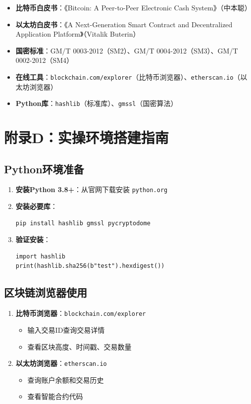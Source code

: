 ﻿\documentclass[12pt,a4paper]{article}
\begin{document}
\begin{itemize}[leftmargin=1.5em]
\item \textbf{比特币白皮书}：《Bitcoin: A Peer-to-Peer Electronic Cash System》（中本聪）
\item \textbf{以太坊白皮书}：《A Next-Generation Smart Contract and Decentralized Application Platform》（Vitalik Buterin）
\item \textbf{国密标准}：GM/T 0003-2012（SM2）、GM/T 0004-2012（SM3）、GM/T 0002-2012（SM4）
\item \textbf{在线工具}：\texttt{blockchain.com/explorer}（比特币浏览器）、\texttt{etherscan.io}（以太坊浏览器）
\item \textbf{Python库}：\texttt{hashlib}（标准库）、\texttt{gmssl}（国密算法）
\end{itemize}

\section{附录D：实操环境搭建指南}

\subsection{Python环境准备}

\begin{enumerate}[leftmargin=1.5em]
\item \textbf{安装Python 3.8+}：从官网下载安装 \texttt{python.org}
\item \textbf{安装必要库}：
\begin{lstlisting}
pip install hashlib gmssl pycryptodome
\end{lstlisting}
\item \textbf{验证安装}：
\begin{lstlisting}
import hashlib
print(hashlib.sha256(b"test").hexdigest())
\end{lstlisting}
\end{enumerate}

\subsection{区块链浏览器使用}

\begin{enumerate}[leftmargin=1.5em]
\item \textbf{比特币浏览器}：\texttt{blockchain.com/explorer}
  \begin{itemize}
  \item 输入交易ID查询交易详情
  \item 查看区块高度、时间戳、交易数量
  \end{itemize}
\item \textbf{以太坊浏览器}：\texttt{etherscan.io}
  \begin{itemize}
  \item 查询账户余额和交易历史
  \item 查看智能合约代码
  \end{itemize}
\end{enumerate}
\end{document}
